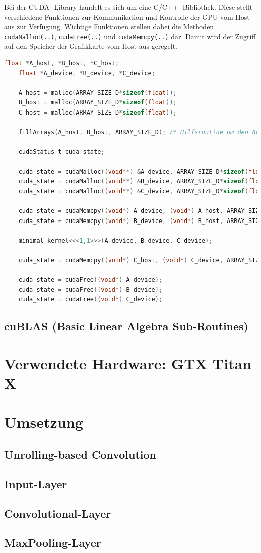 \documentclass[../main.tex]{subfiles}
\begin{document}
Bei der CUDA- Library handelt es sich um eine C/C++ -Bibliothek. Diese stellt verschiedene Funktionen zur Kommunikation und Kontrolle der GPU vom Host aus zur Verfügung. Wichtige Funktionen stellen dabei die Methoden \texttt{cudaMalloc(..)}, \texttt{cudaFree(..)} und \texttt{cudaMemcpy(..)} dar. Damit wird der Zugriff auf den Speicher der Grafikkarte vom Host aus geregelt. \par 
\begin{lstlisting}[language=C, caption=Aufruf des minimalen Kernels mit Speicherzugriff vom Host, captionpos=b, label=listing:min_kernel_host, breaklines]
	float *A_host, *B_host, *C_host;
	float *A_device, *B_device, *C_device;
	
	A_host = malloc(ARRAY_SIZE_D*sizeof(float));
	B_host = malloc(ARRAY_SIZE_D*sizeof(float));
	C_host = malloc(ARRAY_SIZE_D*sizeof(float));
	
	fillArrays(A_host, B_host, ARRAY_SIZE_D); /* Hilfsroutine um den Arrays Werte zuzuweisen */
	
	cudaStatus_t cuda_state;
	
	cuda_state = cudaMalloc((void**) &A_device, ARRAY_SIZE_D*sizeof(float));
	cuda_state = cudaMalloc((void**) &B_device, ARRAY_SIZE_D*sizeof(float));
	cuda_state = cudaMalloc((void**) &C_device, ARRAY_SIZE_D*sizeof(float));
	
	cuda_state = cudaMemcpy((void*) A_device, (void*) A_host, ARRAY_SIZE_D*sizeof(float), cudaMemcpyHostToDevice);
	cuda_state = cudaMemcpy((void*) B_device, (void*) B_host, ARRAY_SIZE_D*sizeof(float), cudaMemcpyHostToDevice);
						
	minimal_kernel<<<1,1>>>(A_device, B_device, C_device);
	
	cuda_state = cudaMemcpy((void*) C_host, (void*) C_device, ARRAY_SIZE_D*sizeof(float), cudaMemcpyHostToDevice);
	
	cuda_state = cudaFree((void*) A_device);
	cuda_state = cudaFree((void*) B_device);
	cuda_state = cudaFree((void*) C_device);
\end{lstlisting}

\subsection{cuBLAS (Basic Linear Algebra Sub-Routines)} \label{sec:cuda_cublas}
\section{Verwendete Hardware: GTX Titan X} \label{sec:cuda_titan}
\section{Umsetzung} \label{sec:cuda_umsetzung} 
\subsection{Unrolling-based Convolution} \label{sec:cuda_unrolling_conv}
\subsection{Input-Layer} \label{sec:cuda_input}
\subsection{Convolutional-Layer} \label{sec:cuda_conv}
\subsection{MaxPooling-Layer} \label{sec:cuda_pooling}
\end{document}
